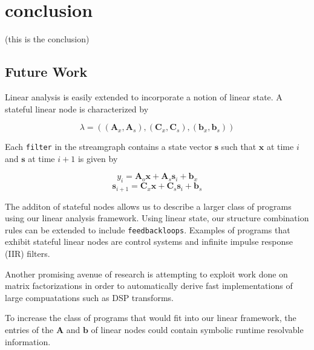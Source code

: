\section{conclusion}

(this is the conclusion)



\subsection{Future Work}

Linear analysis is easily extended to incorporate a notion of linear state.
A stateful linear node is characterized by

\begin{equation} \nonumber
\lambda=(({\mathbf A}_x, {\mathbf A}_s), ({\mathbf C}_x, {\mathbf C}_s), 
({\mathbf b}_x, {\mathbf b}_s))
\end{equation}

Each {\tt filter} in the streamgraph contains a state vector ${\mathbf s}$
such that ${\mathbf x}$ at time $i$ and ${\mathbf s}$ at time $i+1$ is given by

\begin{equation} \nonumber
y_i={\mathbf A}_o{\mathbf x} + {\mathbf A}_s{\mathbf s}_i + {\mathbf b}_x
\end{equation}
\begin{equation} \nonumber
{\mathbf s}_{i+1}={\mathbf C}_x{\mathbf x} + {\mathbf C}_s{\mathbf s}_i + {\mathbf b}_s
\end{equation}

The additon of stateful nodes allows us to describe a larger class of programs 
using our linear analysis framework.
Using linear state, our structure combination rules can be extended to include {\tt feedbackloops}.
Examples of programs that exhibit stateful linear nodes are control systems
and infinite impulse response (IIR) filters.

Another promising avenue of research is attempting to exploit work done
on matrix factorizations in order to automatically derive fast implementations of 
large compuatations such as DSP transforms.

To increase the class of programs that would fit into our linear framework, 
the entries of the ${\mathbf A}$ and ${\mathbf b}$ of linear nodes could contain symbolic
runtime resolvable information.


